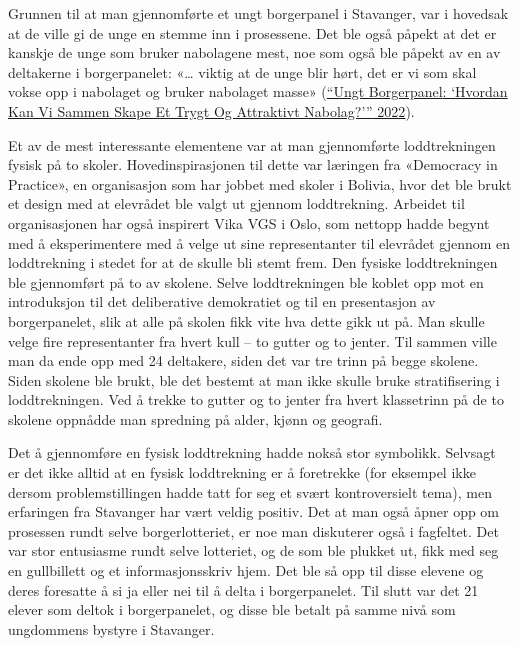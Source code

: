 \documentclass[
  12pt,
  a4paper, 12pt]{article}
\begin{document}
Grunnen til at man gjennomførte et ungt borgerpanel i Stavanger, var i hovedsak at de ville gi de unge en stemme inn i prosessene. Det ble også påpekt at det er kanskje de unge som bruker nabolagene mest, noe som også ble påpekt av en av deltakerne i borgerpanelet: «\ldots{} viktig at de unge blir hørt, det er vi som skal vokse opp i nabolaget og bruker nabolaget masse» (\protect\hyperlink{ref-noauthor_ungt_2022}{{``Ungt {Borgerpanel}: {`{Hvordan} Kan Vi Sammen Skape Et Trygt Og Attraktivt Nabolag?'}''} 2022}).

Et av de mest interessante elementene var at man gjennomførte loddtrekningen fysisk på to skoler. Hovedinspirasjonen til dette var læringen fra «Democracy in Practice», en organisasjon som har jobbet med skoler i Bolivia, hvor det ble brukt et design med at elevrådet ble valgt ut gjennom loddtrekning. Arbeidet til organisasjonen har også inspirert Vika VGS i Oslo, som nettopp hadde begynt med å eksperimentere med å velge ut sine representanter til elevrådet gjennom en loddtrekning i stedet for at de skulle bli stemt frem. Den fysiske loddtrekningen ble gjennomført på to av skolene. Selve loddtrekningen ble koblet opp mot en introduksjon til det deliberative demokratiet og til en presentasjon av borgerpanelet, slik at alle på skolen fikk vite hva dette gikk ut på. Man skulle velge fire representanter fra hvert kull -- to gutter og to jenter. Til sammen ville man da ende opp med 24 deltakere, siden det var tre trinn på begge skolene. Siden skolene ble brukt, ble det bestemt at man ikke skulle bruke stratifisering i loddtrekningen. Ved å trekke to gutter og to jenter fra hvert klassetrinn på de to skolene oppnådde man spredning på alder, kjønn og geografi.

Det å gjennomføre en fysisk loddtrekning hadde nokså stor symbolikk. Selvsagt er det ikke alltid at en fysisk loddtrekning er å foretrekke (for eksempel ikke dersom problemstillingen hadde tatt for seg et svært kontroversielt tema), men erfaringen fra Stavanger har vært veldig positiv. Det at man også åpner opp om prosessen rundt selve borgerlotteriet, er noe man diskuterer også i fagfeltet. Det var stor entusiasme rundt selve lotteriet, og de som ble plukket ut, fikk med seg en gullbillett og et informasjonsskriv hjem. Det ble så opp til disse elevene og deres foresatte å si ja eller nei til å delta i borgerpanelet. Til slutt var det 21 elever som deltok i borgerpanelet, og disse ble betalt på samme nivå som ungdommens bystyre i Stavanger.
\end{document}
